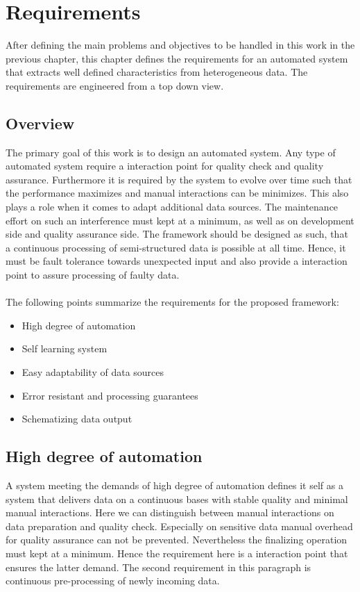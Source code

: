 \chapter{Requirements\label{cha:chapter3}}

After defining the main problems and objectives to be handled in this work in the previous chapter, this chapter defines the requirements for an automated system that extracts well defined characteristics from heterogeneous data. The requirements are engineered from a top down view.

\section{Overview\label{sec:reqoverview}}

The primary goal of this work is to design an automated system. Any type of automated system require a interaction point for quality check and quality assurance. Furthermore it is required by the system to evolve over time such that the performance maximizes and manual interactions can be minimizes. This also plays a role when it comes to adapt additional data sources. The maintenance effort on such an interference must kept at a minimum, as well as on development side and quality assurance side. The framework should be designed as such, that a continuous processing of semi-structured data is possible at all time. Hence, it must be fault tolerance towards unexpected input and also provide a interaction point to assure processing of faulty data.
\\\\
The following points summarize the requirements for the proposed framework:
\begin{itemize}
\item High degree of automation
\item Self learning system
\item Easy adaptability of data sources
\item Error resistant and processing guarantees
\item Schematizing data output 
\end{itemize}

\section{High degree of automation}

A system meeting the demands of high degree of automation defines it self as a system that delivers data on a continuous bases with stable quality and minimal manual interactions. Here we can distinguish between manual interactions on data preparation and quality check. Especially on sensitive data manual overhead for quality assurance can not be prevented. Nevertheless the finalizing operation must kept at a minimum. Hence the requirement here is a interaction point that ensures the latter demand. The second requirement in this paragraph is continuous pre-processing of newly incoming data.

